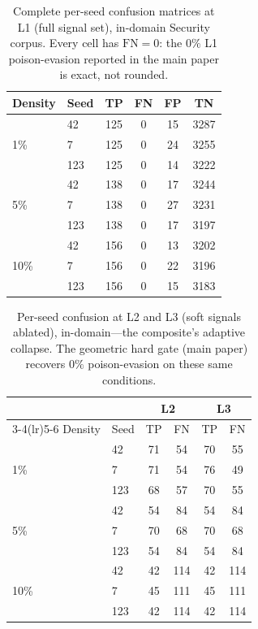 \documentclass[lettersize,journal]{IEEEtran}
\begin{document}
\begin{table}[H]
\centering
\caption{Complete per-seed confusion matrices at L1 (full signal set), in-domain
Security corpus. Every cell has $\mathrm{FN}=0$: the $0\%$ L1 poison-evasion reported
in the main paper is exact, not rounded.}
\label{tab:confL1}
\begin{tabular}{llcccc}
\toprule
Density & Seed & TP & FN & FP & TN \\
\midrule
\multirow{3}{*}{1\%}  & 42  & 125 & 0 & 15 & 3287 \\
                      & 7   & 125 & 0 & 24 & 3255 \\
                      & 123 & 125 & 0 & 14 & 3222 \\
\midrule
\multirow{3}{*}{5\%}  & 42  & 138 & 0 & 17 & 3244 \\
                      & 7   & 138 & 0 & 27 & 3231 \\
                      & 123 & 138 & 0 & 17 & 3197 \\
\midrule
\multirow{3}{*}{10\%} & 42  & 156 & 0 & 13 & 3202 \\
                      & 7   & 156 & 0 & 22 & 3196 \\
                      & 123 & 156 & 0 & 15 & 3183 \\
\bottomrule
\end{tabular}
\end{table}

\begin{table}[H]
\centering
\caption{Per-seed confusion at L2 and L3 (soft signals ablated), in-domain---the
composite's adaptive collapse. The geometric hard gate (main paper)
recovers $0\%$ poison-evasion on these same conditions.}
\label{tab:confL23}
\begin{tabular}{llcccc}
\toprule
 & & \multicolumn{2}{c}{L2} & \multicolumn{2}{c}{L3} \\
\cmidrule(lr){3-4}\cmidrule(lr){5-6}
Density & Seed & TP & FN & TP & FN \\
\midrule
\multirow{3}{*}{1\%}  & 42  & 71 & 54  & 70 & 55  \\
                      & 7   & 71 & 54  & 76 & 49  \\
                      & 123 & 68 & 57  & 70 & 55  \\
\midrule
\multirow{3}{*}{5\%}  & 42  & 54 & 84  & 54 & 84  \\
                      & 7   & 70 & 68  & 70 & 68  \\
                      & 123 & 54 & 84  & 54 & 84  \\
\midrule
\multirow{3}{*}{10\%} & 42  & 42 & 114 & 42 & 114 \\
                      & 7   & 45 & 111 & 45 & 111 \\
                      & 123 & 42 & 114 & 42 & 114 \\
\bottomrule
\end{tabular}
\end{table}
\end{document}
